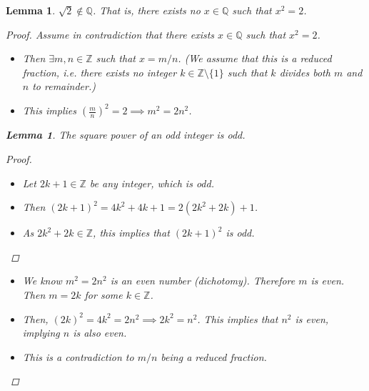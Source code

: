 \documentclass[10pt]{article}
\newcommand{\Z}{\mathbb{Z}}
\newcommand{\Q}{\mathbb{Q}}
\newtheorem{lemma}[theorem]{Lemma}
\theoremstyle{definition}
\theoremstyle{remark}
\begin{document}
\begin{lemma}
    $\sqrt{2} \notin \Q$. That is, there exists no $x \in \Q$ such that $x^2 = 2$.
    \begin{proof}
        Assume in contradiction that there exists $x \in  \Q$ such that $x^2 = 2$.
        \begin{itemize}
            \item
            Then $\exists m, n \in \Z$ such that $x = m / n$. (We assume that this is a reduced fraction, i.e. there exists no integer $k \in \Z \setminus \{1\}$ such that $k$ divides both $m$ and $n$ to remainder.)
            \item   
            This implies $\left(\frac{m}{n}\right)^2 = 2 \implies m^2 = 2n^2$.
        \end{itemize}

        \begin{lemma}
            The square power of an odd integer is odd.
            \begin{proof}
                \hfill
                \begin{itemize}
                    \item
                Let $2k + 1 \in \Z$ be any integer, which is odd.
                    \item
                Then $(2k + 1)^2 = 4k^2 + 4k + 1 = 2(2k^2 + 2k) + 1$.
                    \item   
                As $2k^2 + 2k \in \Z$, this implies that $(2k + 1)^2$ is odd.
                \end{itemize}
            \end{proof}
        \end{lemma}
        \begin{itemize}
            \item
        We know $m^2 = 2n^2$ is an even number (dichotomy). Therefore $m$ is even. Then $m = 2k$ for some $k \in \Z$.
            \item
        Then, $(2k)^2 = 4k^2 = 2n^2 \implies 2k^2 = n^2$. This implies that $n^2$ is even, implying $n$ is also even.
            \item
        This is a contradiction to $m / n$ being a reduced fraction.
        \end{itemize}
    \end{proof}
\end{lemma}
\end{document}

